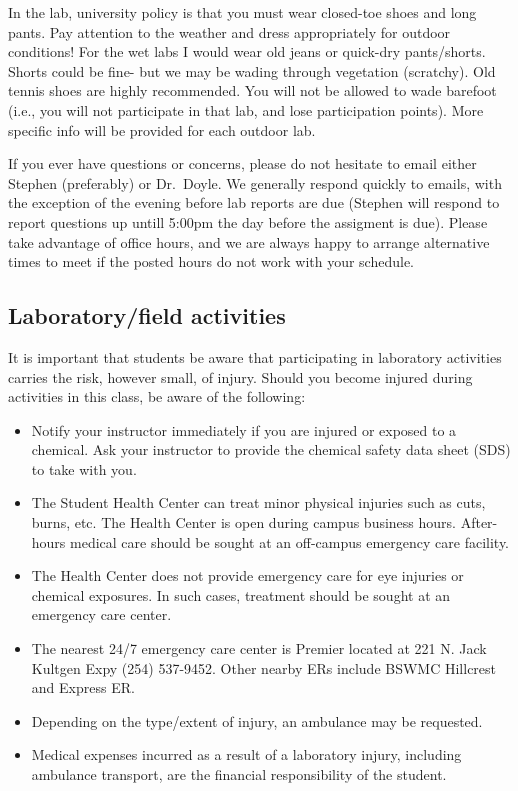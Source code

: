 \documentclass[11pt,]{article}
\providecommand{\tightlist}{%
  \setlength{\itemsep}{0pt}\setlength{\parskip}{0pt}}
\begin{document}
In the lab, university policy is that you must wear closed-toe shoes and
long pants. Pay attention to the weather and dress appropriately for
outdoor conditions! For the wet labs I would wear old jeans or quick-dry
pants/shorts. Shorts could be fine- but we may be wading through
vegetation (scratchy). Old tennis shoes are highly recommended. You will
not be allowed to wade barefoot (i.e., you will not participate in that
lab, and lose participation points). More specific info will be provided
for each outdoor lab.

If you ever have questions or concerns, please do not hesitate to email
either Stephen (preferably) or Dr.~Doyle. We generally respond quickly
to emails, with the exception of the evening before lab reports are due
(Stephen will respond to report questions up untill 5:00pm the day
before the assigment is due). Please take advantage of office hours, and
we are always happy to arrange alternative times to meet if the posted
hours do not work with your schedule.

\subsection{Laboratory/field
activities}\label{laboratoryfield-activities}

It is important that students be aware that participating in laboratory
activities carries the risk, however small, of injury. Should you become
injured during activities in this class, be aware of the following:

\begin{itemize}
\tightlist
\item
  Notify your instructor immediately if you are injured or exposed to a
  chemical. Ask your instructor to provide the chemical safety data
  sheet (SDS) to take with you.
\item
  The Student Health Center can treat minor physical injuries such as
  cuts, burns, etc. The Health Center is open during campus business
  hours. After-hours medical care should be sought at an off-campus
  emergency care facility.
\item
  The Health Center does not provide emergency care for eye injuries or
  chemical exposures. In such cases, treatment should be sought at an
  emergency care center.
\item
  The nearest 24/7 emergency care center is Premier located at 221 N.
  Jack Kultgen Expy (254) 537-9452. Other nearby ERs include BSWMC
  Hillcrest and Express ER.
\item
  Depending on the type/extent of injury, an ambulance may be requested.
\item
  Medical expenses incurred as a result of a laboratory injury,
  including ambulance transport, are the financial responsibility of the
  student.
\end{itemize}
\end{document}
